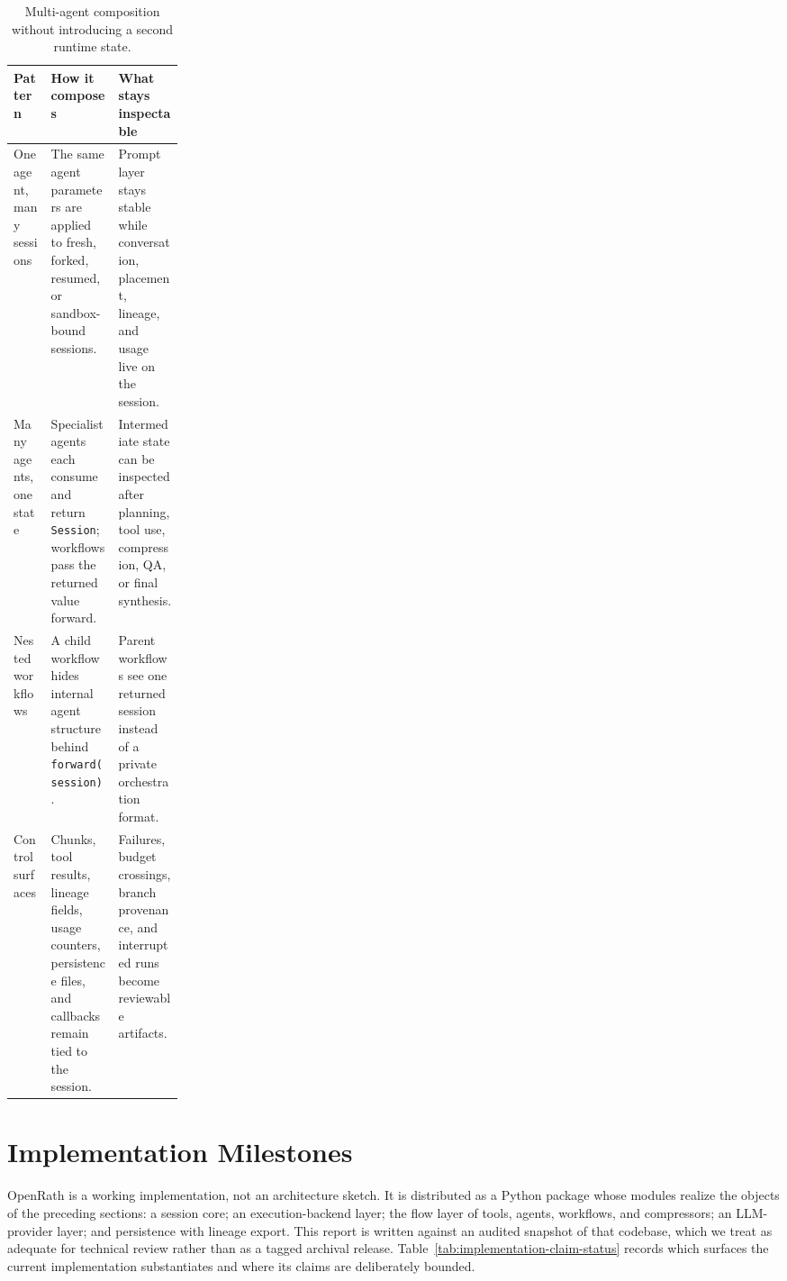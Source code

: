 \documentclass{llmxive}
\begin{document}
\begin{table}[!htbp]
\vspace{0.1em}
\centering
\small
\begin{tabularx}{\linewidth}{@{}>{\arraybackslash}p{0.22\linewidth}>{\arraybackslash}X>{\arraybackslash}X@{}}
\toprule
Pattern & How it composes & What stays inspectable \\
\midrule
One agent, many sessions & The same agent parameters are applied to fresh, forked, resumed, or sandbox-bound sessions. & Prompt layer stays stable while conversation, placement, lineage, and usage live on the session. \\
Many agents, one state & Specialist agents each consume and return \texttt{Session}; workflows pass the returned value forward. & Intermediate state can be inspected after planning, tool use, compression, QA, or final synthesis. \\
Nested workflows & A child workflow hides internal agent structure behind \texttt{forward(session)}. & Parent workflows see one returned session instead of a private orchestration format. \\
Control surfaces & Chunks, tool results, lineage fields, usage counters, persistence files, and callbacks remain tied to the session. & Failures, budget crossings, branch provenance, and interrupted runs become reviewable artifacts. \\
\bottomrule
\end{tabularx}
\vspace{0.1em}
\caption{Multi-agent composition without introducing a second runtime state.}
\label{tab:compact-multi-agent-design}
\end{table}


\section{Implementation Milestones}
\label{sec:milestones}

OpenRath is a working implementation, not an architecture sketch. It is
distributed as a Python package whose modules realize the objects of the
preceding sections: a session core; an execution-backend layer; the flow layer
of tools, agents, workflows, and compressors; an LLM-provider layer; and
persistence with lineage export. This report is written against an audited
snapshot of that codebase, which we treat as adequate for technical review
rather than as a tagged archival release.
Table~\ref{tab:implementation-claim-status} records which surfaces the current
implementation substantiates and where its claims are deliberately bounded.
\end{document}
